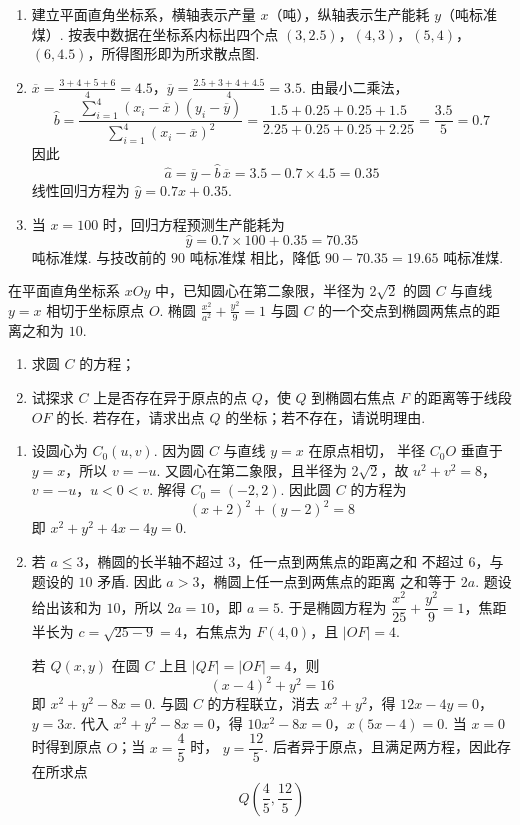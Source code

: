 \begin{solution}
\begin{enumerate}
\item 建立平面直角坐标系，横轴表示产量 \(x\)（吨），纵轴表示生产能耗 \(y\)（吨标准煤）.
按表中数据在坐标系内标出四个点
\((3,2.5)\)，\((4,3)\)，\((5,4)\)，\((6,4.5)\)，所得图形即为所求散点图.
\item
\(\overline{x}=\frac{3+4+5+6}{4}=4.5\)，\(\overline{y}=\frac{2.5+3+4+4.5}{4}=3.5\).
由最小二乘法，
\[
\hat{b}
=\frac{\sum_{i=1}^{4}(x_i-\overline{x})(y_i-\overline{y})}
{\sum_{i=1}^{4}(x_i-\overline{x})^{2}}
=\frac{1.5+0.25+0.25+1.5}{2.25+0.25+0.25+2.25}
=\frac{3.5}{5}=0.7
\]
因此
\[
\hat{a}=\overline{y}-\hat{b}\,\overline{x}=3.5-0.7\times4.5=0.35
\]
线性回归方程为 \(\hat{y}=0.7x+0.35\).
\item 当 \(x=100\) 时，回归方程预测生产能耗为
\[
\hat{y}=0.7\times100+0.35=70.35
\]
吨标准煤. 与技改前的 \(90\text{ 吨标准煤}\) 相比，降低
\(90-70.35=19.65\text{ 吨标准煤}\).
\end{enumerate}
\end{solution}

\begin{problem}
在平面直角坐标系 \(xOy\) 中，已知圆心在第二象限，半径为 \(2\sqrt{2}\) 的圆 \(C\) 与直线 \(y = x\) 相切于坐标原点 \(O\). 椭圆 \(\frac{x^2}{a^2} + \frac{y^2}{9} = 1\) 与圆 \(C\) 的一个交点到椭圆两焦点的距离之和为 \(10\).

\begin{enumerate}
\item 求圆 \(C\) 的方程；
\item 试探求 \(C\) 上是否存在异于原点的点 \(Q\)，使 \(Q\) 到椭圆右焦点 \(F\) 的距离等于线段 \(OF\) 的长. 若存在，请求出点 \(Q\) 的坐标；若不存在，请说明理由.
\end{enumerate}
\end{problem}

\begin{solution}
\begin{enumerate}
\item 设圆心为 \(C_{0}(u,v)\). 因为圆 \(C\) 与直线 \(y=x\) 在原点相切，
半径 \(C_{0}O\) 垂直于 \(y=x\)，所以 \(v=-u\). 又圆心在第二象限，且半径为
\(2\sqrt{2}\)，故
\(u^{2}+v^{2}=8\)，\(v=-u\)，\(u<0<v\).
解得 \(C_{0}=(-2,2)\). 因此圆 \(C\) 的方程为
\[
(x+2)^{2}+(y-2)^{2}=8
\]
即 \(x^{2}+y^{2}+4x-4y=0\).
\item 若 \(a\leqslant3\)，椭圆的长半轴不超过 \(3\)，任一点到两焦点的距离之和
不超过 \(6\)，与题设的 \(10\) 矛盾. 因此 \(a>3\)，椭圆上任一点到两焦点的距离
之和等于 \(2a\). 题设给出该和为 \(10\)，所以 \(2a=10\)，即 \(a=5\). 于是椭圆方程为
\(\dfrac{x^{2}}{25}+\dfrac{y^{2}}{9}=1\)，焦距半长为
\(c=\sqrt{25-9}=4\)，右焦点为 \(F(4,0)\)，且 \(|OF|=4\).

若 \(Q(x,y)\) 在圆 \(C\) 上且 \(|QF|=|OF|=4\)，则
\[
(x-4)^{2}+y^{2}=16
\]
即 \(x^{2}+y^{2}-8x=0\). 与圆 \(C\) 的方程联立，消去
\(x^{2}+y^{2}\)，得
\(12x-4y=0\)，\(y=3x\).
代入 \(x^{2}+y^{2}-8x=0\)，得
\(10x^{2}-8x=0\)，\(x(5x-4)=0\).
当 \(x=0\) 时得到原点 \(O\)；当 \(x=\dfrac{4}{5}\) 时，
\(y=\dfrac{12}{5}\). 后者异于原点，且满足两方程，因此存在所求点
\[
Q\left(\frac{4}{5},\frac{12}{5}\right)
\]
\end{enumerate}
\end{solution}

